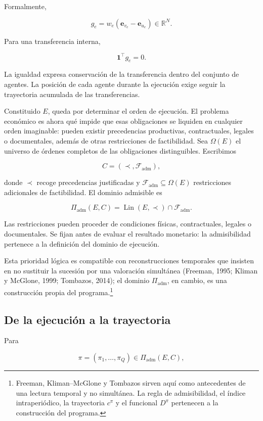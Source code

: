 \documentclass[10pt,a5paper,twoside]{article}
\begin{document}
Formalmente,

\[
g_e=w_e(\mathbf e_{v_e}-\mathbf e_{u_e})\in\mathbb R^N.
\]

Para una transferencia interna,

\[
\mathbf1^\top g_e=0.
\]

La igualdad expresa conservación de la transferencia dentro del conjunto
de agentes. La posición de cada agente durante la ejecución exige seguir la
trayectoria acumulada de las transferencias.

Constituido \(E\), queda por determinar el orden de ejecución. El problema económico
es ahora qué impide que esas obligaciones se liquiden en cualquier orden imaginable:
pueden existir precedencias productivas, contractuales, legales o documentales, además
de otras restricciones de factibilidad. Sea \(\Omega(E)\) el
universo de órdenes completos de las obligaciones distinguibles.
Escribimos

\[
C=(\prec,\mathcal F_{\mathrm{adm}}),
\]

donde \(\prec\) recoge precedencias justificadas y
\(\mathcal F_{\mathrm{adm}}\subseteq\Omega(E)\) restricciones
adicionales de factibilidad. El dominio admisible es

\[
\Pi_{\mathrm{adm}}(E,C)
=
\operatorname{Lin}(E,\prec)\cap\mathcal F_{\mathrm{adm}}.
\]

Las restricciones pueden proceder de condiciones físicas, contractuales,
legales o documentales. Se fijan antes de evaluar el resultado monetario:
la admisibilidad pertenece a la definición del dominio de ejecución.

Esta prioridad lógica es compatible con reconstrucciones temporales que
insisten en no sustituir la sucesión por una valoración simultánea
(Freeman, 1995; Kliman y McGlone, 1999; Tombazos, 2014); el dominio
\(\Pi_{\mathrm{adm}}\), en cambio, es una construcción propia del
programa.\footnote{Freeman, Kliman--McGlone y Tombazos sirven aquí como
  antecedentes de una lectura temporal y no simultánea. La regla de
  admisibilidad, el índice intraperiódico, la trayectoria \(c^\pi\) y el
  funcional \(D^\pi\) pertenecen a la construcción del programa.}

\subsection{De la ejecución a la trayectoria}\label{de-la-ejecuciuxf3n-a-la-trayectoria}

Para

\[
\pi=(\pi_1,\ldots,\pi_Q)\in\Pi_{\mathrm{adm}}(E,C),
\]
\end{document}
